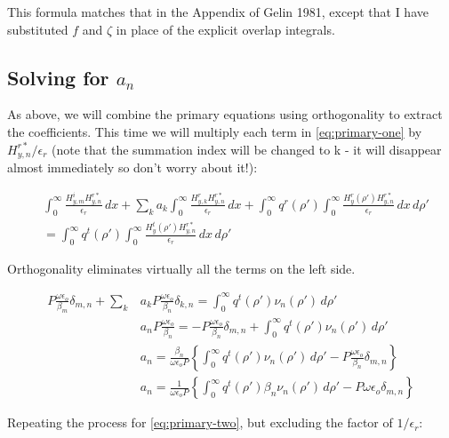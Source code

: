 \documentclass[11pt, oneside]{article}   	%
\begin{document}
\noindent This formula matches that in the Appendix of Gelin 1981, except that I have substituted $f$ and $\zeta$ in place of the explicit overlap integrals.


\subsection{Solving for $a_{n}$}

As above, we will combine the primary equations using orthogonality to extract the coefficients. This time we will multiply each term in \eqref{eq:primary-one} by $ H_{y,n}^{r*} / \epsilon_{r}$ (note that the summation index will be changed to k - it will disappear almost immediately so don't worry about it!):

\begin{align}
&\int_{0}^{\infty} \frac{H_{y,m}^{i} H_{y,n}^{r*}}{\epsilon_{r}} \, dx
+ \sum_{k} a_{k} \int_{0}^{\infty}  \frac{H_{y,k}^{r} H_{y,n}^{r*}}{\epsilon_{r}}\, dx 
+ \int_{0}^{\infty} q^{r} (\rho ') \int_{0}^{\infty} \frac{H_{y}^{r} (\rho ') H_{y,n}^{r*}}{\epsilon_{r}} \, dx \, d\rho ' \nonumber \\
&= \int_{0}^{\infty} q^{t} (\rho ') \int_{0}^{\infty} \frac{H_{y}^{t} (\rho ') H_{y,n}^{r*}}{\epsilon_{r}} \, dx \, d\rho '
\end{align}

\noindent Orthogonality eliminates virtually all the terms on the left side.

\begin{align}
P \frac{\omega \epsilon_{o}}{\beta_{m}}\delta_{m,n} + \sum_{k} &a_{k} P \frac{\omega \epsilon_{o}}{\beta_{n}}\delta_{k,n}
= \int_{0}^{\infty} q^{t} (\rho ') \nu_{n}(\rho ') \, d\rho ' \nonumber \\
&a_{n} P \frac{\omega \epsilon_{o}}{\beta_{n}}
= -P \frac{\omega \epsilon_{o}}{\beta_{n}}\delta_{m,n} + \int_{0}^{\infty} q^{t} (\rho ') \nu_{n}(\rho ') \, d\rho ' \nonumber \\
&a_{n} = \frac{\beta_{n}}{\omega \epsilon_{o} P} \left\{\int_{0}^{\infty} q^{t} (\rho ') \nu_{n}(\rho ') \, d\rho ' -P \frac{\omega \epsilon_{o}}{\beta_{n}}\delta_{m,n} \right\} \nonumber \\
&a_{n} = \frac{1}{\omega \epsilon_{o} P} \left\{\int_{0}^{\infty} q^{t} (\rho ') \beta_{n}\nu_{n}(\rho ') \, d\rho ' -P \omega \epsilon_{o}\delta_{m,n} \right\}
\label{eq:an-tm-1}
\end{align}

\noindent Repeating the process for \eqref{eq:primary-two}, but excluding the factor of $1/\epsilon_{r}$:
\end{document}
